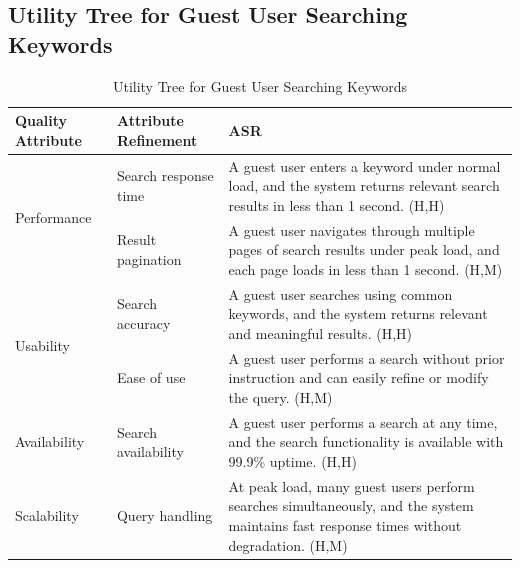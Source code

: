 \documentclass{article}
\begin{document}
\subsection{Utility Tree for Guest User Searching Keywords}

\begin{table}[H]
    \centering
    \caption{Utility Tree for Guest User Searching Keywords}
    \begin{tabular}{|p{3cm}|p{4cm}|p{7cm}|}
        \hline
        \textbf{Quality Attribute} & \textbf{Attribute Refinement}                                                                                                           & \textbf{ASR} \\
        \hline

        \multirow{2}{*}{Performance}
                                   & Search response time
                                   & A guest user enters a keyword under normal load, and the system returns relevant search results in less than 1 second. (H,H)                           \\
        \cline{2-3}
                                   & Result pagination
                                   & A guest user navigates through multiple pages of search results under peak load, and each page loads in less than 1 second. (H,M)                      \\
        \hline

        \multirow{2}{*}{Usability}
                                   & Search accuracy
                                   & A guest user searches using common keywords, and the system returns relevant and meaningful results. (H,H)                                             \\
        \cline{2-3}
                                   & Ease of use
                                   & A guest user performs a search without prior instruction and can easily refine or modify the query. (H,M)                                              \\
        \hline

        Availability
                                   & Search availability
                                   & A guest user performs a search at any time, and the search functionality is available with 99.9\% uptime. (H,H)                                        \\
        \hline

        Scalability
                                   & Query handling
                                   & At peak load, many guest users perform searches simultaneously, and the system maintains fast response times without degradation. (H,M)                \\
        \hline


\end{tabular}
\end{table}
\end{document}

